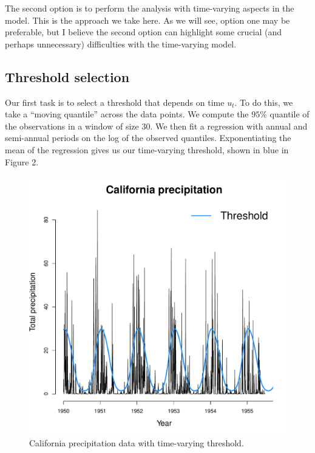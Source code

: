 \documentclass[12pt]{article}
\begin{document}
\noindent The second option is to perform the analysis with time-varying aspects in the model. This is the approach we take here. As we will see, option one may be preferable, but I believe the second option can highlight some crucial (and perhaps unnecessary) difficulties with the time-varying model.

\subsection*{Threshold selection}

\noindent Our first task is to select a threshold that depends on time $u_t$. To do this, we take a ``moving quantile'' across the data points. We compute the $95\%$ quantile of the observations in a window of size $30$. We then fit a regression with annual and semi-annual periods on the log of the observed quantiles. Exponentiating the mean of the regression gives us our time-varying threshold, shown in blue in Figure 2.

\begin{figure}[H]
\begin{center}
\includegraphics[scale=0.30]{../figs/threshold.pdf}
\end{center}
\caption{California precipitation data with time-varying threshold.}
\end{figure}
\end{document}
